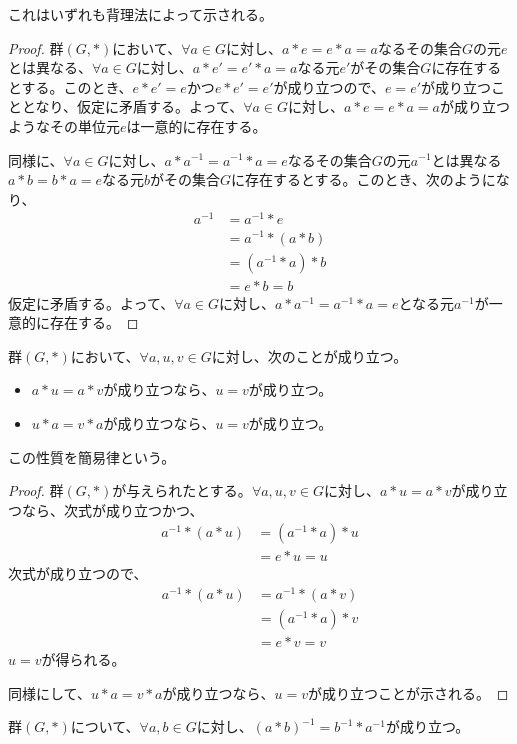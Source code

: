 \documentclass[dvipdfmx]{jsarticle}
\begin{document}
これはいずれも背理法によって示される。
\begin{proof}
群$(G,*)$において、$\forall a \in G$に対し、$a*e = e*a = a$なるその集合$G$の元$e$とは異なる、$\forall a \in G$に対し、$a*e' = e'*a = a$なる元$e'$がその集合$G$に存在するとする。このとき、$e*e' = e$かつ$e*e' = e'$が成り立つので、$e = e'$が成り立つこととなり、仮定に矛盾する。よって、$\forall a \in G$に対し、$a*e = e*a = a$が成り立つようなその単位元$e$は一意的に存在する。\par
同様に、$\forall a \in G$に対し、$a*a^{- 1} = a^{- 1}*a = e$なるその集合$G$の元$a^{- 1}$とは異なる$a*b = b*a = e$なる元$b$がその集合$G$に存在するとする。このとき、次のようになり、
\begin{align*}
a^{- 1} &= a^{- 1}*e\\
&= a^{- 1}*(a*b)\\
&= \left( a^{- 1}*a \right)*b\\
&= e*b = b
\end{align*}
仮定に矛盾する。よって、$\forall a \in G$に対し、$a*a^{- 1} = a^{- 1}*a = e$となる元$a^{- 1}$が一意的に存在する。
\end{proof}
\begin{thm}[簡易律]\label{2.1.1.2}
群$(G,*)$において、$\forall a,u,v \in G$に対し、次のことが成り立つ。
\begin{itemize}
\item
  $a*u = a*v$が成り立つなら、$u = v$が成り立つ。
\item
  $u*a = v*a$が成り立つなら、$u = v$が成り立つ。
\end{itemize}
\par
この性質を簡易律という。
\end{thm}
\begin{proof}
群$(G,*)$が与えられたとする。$\forall a,u,v \in G$に対し、$a*u = a*v$が成り立つなら、次式が成り立つかつ、
\begin{align*}
a^{- 1}*(a*u) &= \left( a^{- 1}*a \right)*u\\
&= e*u = u
\end{align*}
次式が成り立つので、
\begin{align*}
a^{- 1}*(a*u) &= a^{- 1}*(a*v)\\
&= \left( a^{- 1}*a \right)*v\\
&= e*v = v
\end{align*}
$u = v$が得られる。\par
同様にして、$u*a = v*a$が成り立つなら、$u = v$が成り立つことが示される。
\end{proof}
\begin{thm}\label{2.1.1.3}
群$(G,*)$について、$\forall a,b \in G$に対し、$(a*b)^{- 1} = b^{- 1}*a^{- 1}$が成り立つ。
\end{thm}
\end{document}

